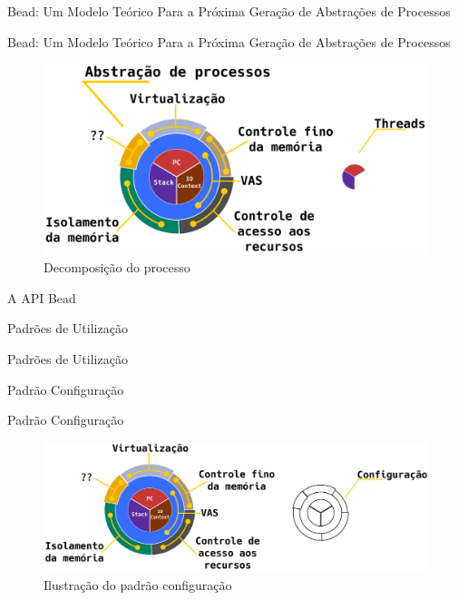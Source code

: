 \documentclass[xcolor={usenames,svgnames,dvipsnames},brazil,english,12pt,aspectratio=149]{beamer}
\begin{document}
\begin{frame}{Bead: Um Modelo Teórico Para a Próxima Geração de Abstrações de Processos}
	
\end{frame}

\begin{frame}{Bead: Um Modelo Teórico Para a Próxima Geração de Abstrações de Processos}
	\begin{figure}[!h]
		\centering
		\includegraphics[width=\textwidth]{decomposicao_overview}
		\caption{Decomposição do processo}
		\label{fig:decomposicao_proc}
	\end{figure}
\end{frame}

\begin{frame}{A API Bead}
\end{frame}

\begin{frame}{Padrões de Utilização}
\end{frame}

\begin{frame}{Padrões de Utilização}
\end{frame}

\begin{frame}{Padrão Configuração}
\end{frame}

\begin{frame}{Padrão Configuração}
	\begin{figure}[!h]
		\centering
		\includegraphics[width=\textwidth]{decomposition_conf}
		\caption{Ilustração do padrão configuração}
		\label{fig:decomposicao_conf}
	\end{figure}
\end{frame}
\end{document}

